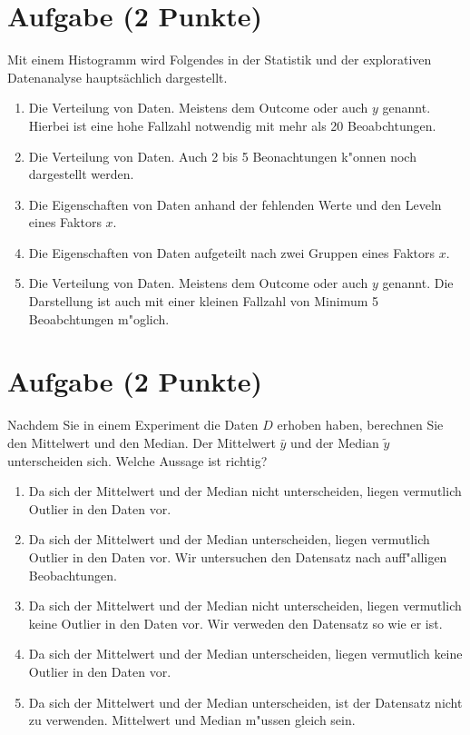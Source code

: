\documentclass[a4paper, 10pt]{scrartcl}\usepackage[]{graphicx}\usepackage[]{xcolor}
\begin{document}
\section{Aufgabe \hfill (2 Punkte)}



Mit einem Histogramm wird Folgendes in der Statistik und der explorativen Datenanalyse haupts{\"a}chlich dargestellt.



\begin{enumerate}
\item [\textbf{A} \msquare] Die Verteilung von Daten. Meistens dem Outcome oder auch $y$ genannt. Hierbei ist eine hohe Fallzahl notwendig mit mehr als 20 Beoabchtungen.
\item [\textbf{B} \msquare] Die Verteilung von Daten. Auch 2 bis 5 Beonachtungen k{"o}nnen noch dargestellt werden.
\item [\textbf{C} \msquare] Die Eigenschaften von Daten anhand der fehlenden Werte und den Leveln eines Faktors $x$.
\item [\textbf{D} \msquare] Die Eigenschaften von Daten aufgeteilt nach zwei Gruppen eines Faktors $x$.
\item [\textbf{E} \msquare] Die Verteilung von Daten. Meistens dem Outcome oder auch $y$ genannt. Die Darstellung ist auch mit einer kleinen Fallzahl von Minimum 5 Beoabchtungen m{"o}glich.
\end{enumerate} 

\section{Aufgabe \hfill (2 Punkte)}



Nachdem Sie in einem Experiment die Daten $D$ erhoben haben, berechnen Sie den
Mittelwert und den Median. Der Mittelwert $\bar{y}$ und der Median
$\tilde{y}$ unterscheiden sich. Welche Aussage ist richtig?




\begin{enumerate}
\item [\textbf{A} \msquare] Da sich der Mittelwert und der Median nicht unterscheiden, liegen vermutlich Outlier in den Daten vor.
\item [\textbf{B} \msquare] Da sich der Mittelwert und der Median unterscheiden, liegen vermutlich Outlier in den Daten vor. Wir untersuchen den Datensatz nach auff{"a}lligen Beobachtungen.
\item [\textbf{C} \msquare] Da sich der Mittelwert und der Median nicht unterscheiden, liegen vermutlich keine Outlier in den Daten vor. Wir verweden den Datensatz so wie er ist.
\item [\textbf{D} \msquare] Da sich der Mittelwert und der Median unterscheiden, liegen vermutlich keine Outlier in den Daten vor.
\item [\textbf{E} \msquare] Da sich der Mittelwert und der Median unterscheiden, ist der Datensatz nicht zu verwenden. Mittelwert und Median m{"u}ssen gleich sein.
\end{enumerate}
\end{document}
